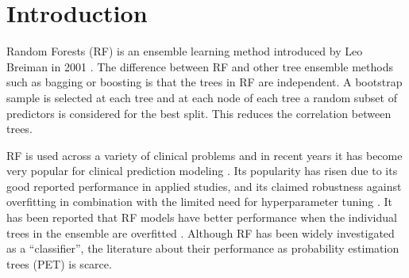 \newpage

\section{Introduction}

Random Forests (\gls{RF}) is an ensemble learning method introduced by Leo Breiman in
2001 \cite{breimanRandomForests2001}. The difference between \gls{RF} and other tree
ensemble methods such as bagging or boosting is that the trees in \gls{RF} are
independent. A bootstrap sample is selected at each tree and at each node of
each tree a random subset of predictors is considered for the best split. This
reduces the correlation between trees.

\gls{RF} is used across a variety of clinical problems
 \cite{fernandez-delgadoWeNeedHundreds2014} and in recent years it has become
very popular for clinical prediction modeling
 \cite{corradiPredictionIncidentDelirium2018,daiUsingRandomForest2018,xuRiskPredictionType2017,yaoNovelMethodDisease2013}.
Its popularity has risen due to its good reported performance in applied studies,
and its claimed robustness against overfitting in combination with the limited
need for hyperparameter tuning \cite{oshiroHowManyTrees2012}. It has been
reported that \gls{RF} models have better performance when the individual trees in the
ensemble are overfitted
 \cite{biauRandomForestGuided2016,denilNarrowingGapRandom2014,breimanINFINITYTHEORYPREDICTOR2000}.
Although \gls{RF} has been widely investigated as a ``classifier'', the literature
about their performance as probability estimation trees (\gls{PET}) is scarce.

